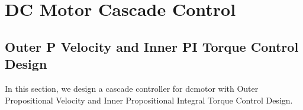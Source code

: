 \chapter{DC Motor Cascade Control}

\section{Outer P Velocity and Inner PI Torque Control Design }
In this section, we design a cascade controller for dcmotor with Outer Propositional Velocity and Inner Propositional Integral Torque Control Design.

	\begin{figure}[h]
		\centering
		
	\end{figure}


